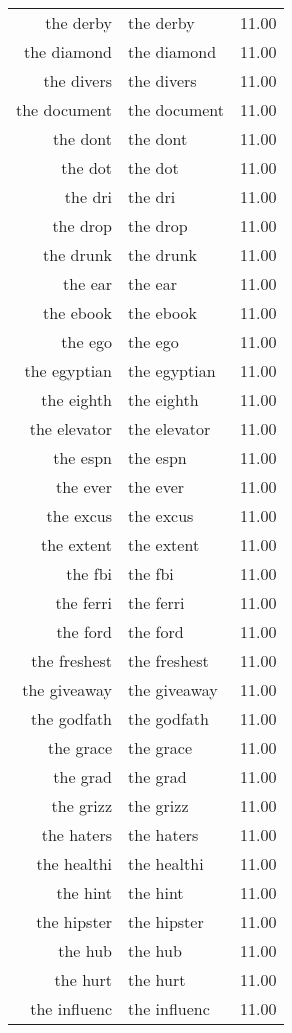 \begin{table}[ht]
\begin{tabular}{rlr}
  the derby & the derby & 11.00 \\ 
  the diamond & the diamond & 11.00 \\ 
  the divers & the divers & 11.00 \\ 
  the document & the document & 11.00 \\ 
  the dont & the dont & 11.00 \\ 
  the dot & the dot & 11.00 \\ 
  the dri & the dri & 11.00 \\ 
  the drop & the drop & 11.00 \\ 
  the drunk & the drunk & 11.00 \\ 
  the ear & the ear & 11.00 \\ 
  the ebook & the ebook & 11.00 \\ 
  the ego & the ego & 11.00 \\ 
  the egyptian & the egyptian & 11.00 \\ 
  the eighth & the eighth & 11.00 \\ 
  the elevator & the elevator & 11.00 \\ 
  the espn & the espn & 11.00 \\ 
  the ever & the ever & 11.00 \\ 
  the excus & the excus & 11.00 \\ 
  the extent & the extent & 11.00 \\ 
  the fbi & the fbi & 11.00 \\ 
  the ferri & the ferri & 11.00 \\ 
  the ford & the ford & 11.00 \\ 
  the freshest & the freshest & 11.00 \\ 
  the giveaway & the giveaway & 11.00 \\ 
  the godfath & the godfath & 11.00 \\ 
  the grace & the grace & 11.00 \\ 
  the grad & the grad & 11.00 \\ 
  the grizz & the grizz & 11.00 \\ 
  the haters & the haters & 11.00 \\ 
  the healthi & the healthi & 11.00 \\ 
  the hint & the hint & 11.00 \\ 
  the hipster & the hipster & 11.00 \\ 
  the hub & the hub & 11.00 \\ 
  the hurt & the hurt & 11.00 \\ 
  the influenc & the influenc & 11.00 \\ 

\end{tabular}
\end{table}
